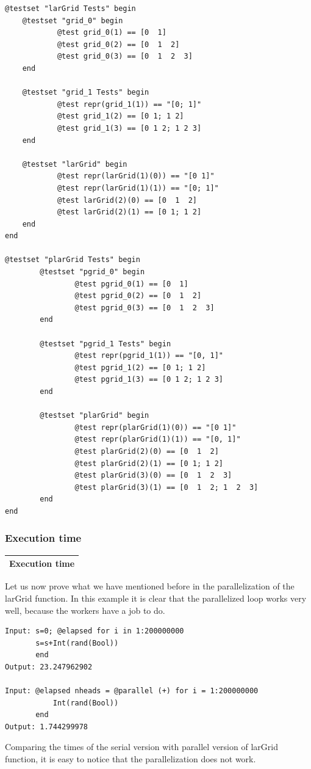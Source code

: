 \documentclass{article}
\begin{document}
\begin{flushleft}\small
\begin{list}{}{} \item
\begin{Verbatim}[tabsize=4]
@testset "larGrid Tests" begin
	@testset "grid_0" begin
			@test grid_0(1) == [0  1]
			@test grid_0(2) == [0  1  2]
			@test grid_0(3) == [0  1  2  3]
	end
   
	@testset "grid_1 Tests" begin
			@test repr(grid_1(1)) == "[0; 1]"
			@test grid_1(2) == [0 1; 1 2]
			@test grid_1(3) == [0 1 2; 1 2 3]
	end
   
	@testset "larGrid" begin
			@test repr(larGrid(1)(0)) == "[0 1]"
			@test repr(larGrid(1)(1)) == "[0; 1]"
			@test larGrid(2)(0) == [0  1  2]
			@test larGrid(2)(1) == [0 1; 1 2]
	end
end 

@testset "plarGrid Tests" begin
   		@testset "pgrid_0" begin
    			@test pgrid_0(1) == [0  1]
    			@test pgrid_0(2) == [0  1  2]
    			@test pgrid_0(3) == [0  1  2  3]
		end
       
		@testset "pgrid_1 Tests" begin
      			@test repr(pgrid_1(1)) == "[0, 1]"
    			@test pgrid_1(2) == [0 1; 1 2]
    			@test pgrid_1(3) == [0 1 2; 1 2 3]
		end
   
   		@testset "plarGrid" begin
    			@test repr(plarGrid(1)(0)) == "[0 1]"
    			@test repr(plarGrid(1)(1)) == "[0, 1]"
    			@test plarGrid(2)(0) == [0  1  2]
    			@test plarGrid(2)(1) == [0 1; 1 2]
    			@test plarGrid(3)(0) == [0  1  2  3]
    			@test plarGrid(3)(1) == [0  1  2; 1  2  3]
		end
end 
\end{Verbatim}
\end{list}
\end{flushleft}
\subsubsection{Execution time}
\begin{center}
\begin{tabular}{|p{16cm}|}
\hline
\cellcolor[gray]{.9}Execution time\\
\hline
\end{tabular}
\end{center}
Let us now prove what we have mentioned before in the parallelization of the larGrid function.
In this example it is clear that the parallelized loop works very well, because the workers have a job to do.
\begin{flushleft}\small
\begin{list}{}{} \item
   \begin{Verbatim}[tabsize=4]
Input: s=0; @elapsed for i in 1:200000000
       s=s+Int(rand(Bool))
       end
Output: 23.247962902

Input: @elapsed nheads = @parallel (+) for i = 1:200000000
           Int(rand(Bool))
       end
Output: 1.744299978
\end{Verbatim}
\end{list}
\end{flushleft}
Comparing the times of the serial version with parallel version of larGrid function, it is easy to notice that the parallelization does not work.
\vspace{2ex}
\end{document}
